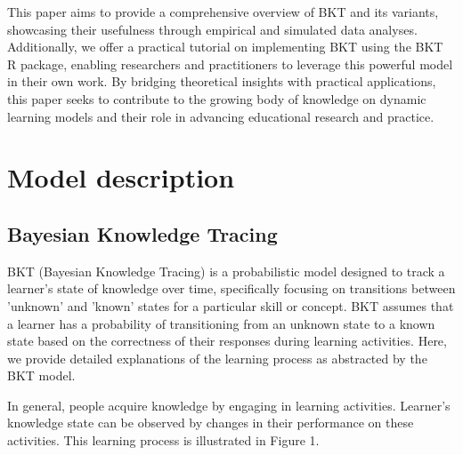 \documentclass{article}
\begin{document}
This paper aims to provide a comprehensive overview of BKT and its variants, showcasing their usefulness through empirical and simulated data analyses. Additionally, we offer a practical tutorial on implementing BKT using the BKT R package, enabling researchers and practitioners to leverage this powerful model in their own work. By bridging theoretical insights with practical applications, this paper seeks to contribute to the growing body of knowledge on dynamic learning models and their role in advancing educational research and practice.

\section{Model description}

\subsection{Bayesian Knowledge Tracing}
BKT (Bayesian Knowledge Tracing) is a probabilistic model designed to track a learner’s state of knowledge over time, specifically focusing on transitions between 'unknown' and 'known' states for a particular skill or concept. BKT assumes that a learner has a probability of transitioning from an unknown state to a known state based on the correctness of their responses during learning activities. Here, we provide detailed explanations of the learning process as abstracted by the BKT model.

In general, people acquire knowledge by engaging in learning activities. Learner's knowledge state can be observed by changes in their performance on these activities. This learning process is illustrated in Figure 1.
\end{document}
